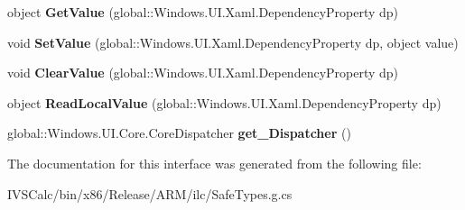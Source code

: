 \begin{DoxyCompactItemize}
object {\bfseries Get\+Value} (global\+::\+Windows.\+U\+I.\+Xaml.\+Dependency\+Property dp)
\item 
\mbox{\label{interface_windows_1_1_u_i_1_1_xaml_1_1_i_dependency_object_a7174b4128f6df875a6cd6f3b979105da}} 
void {\bfseries Set\+Value} (global\+::\+Windows.\+U\+I.\+Xaml.\+Dependency\+Property dp, object value)
\item 
\mbox{\label{interface_windows_1_1_u_i_1_1_xaml_1_1_i_dependency_object_a1169e582ab655b744276f5fc85131e33}} 
void {\bfseries Clear\+Value} (global\+::\+Windows.\+U\+I.\+Xaml.\+Dependency\+Property dp)
\item 
\mbox{\label{interface_windows_1_1_u_i_1_1_xaml_1_1_i_dependency_object_ac164cdf8cd074ee7873c1b78067c67a9}} 
object {\bfseries Read\+Local\+Value} (global\+::\+Windows.\+U\+I.\+Xaml.\+Dependency\+Property dp)
\item 
\mbox{\label{interface_windows_1_1_u_i_1_1_xaml_1_1_i_dependency_object_ab52f7609e07a50a387cb3677a4d0304f}} 
global\+::\+Windows.\+U\+I.\+Core.\+Core\+Dispatcher {\bfseries get\+\_\+\+Dispatcher} ()
\end{DoxyCompactItemize}


The documentation for this interface was generated from the following file\+:\begin{DoxyCompactItemize}
\item 
I\+V\+S\+Calc/bin/x86/\+Release/\+A\+R\+M/ilc/Safe\+Types.\+g.\+cs\end{DoxyCompactItemize}
